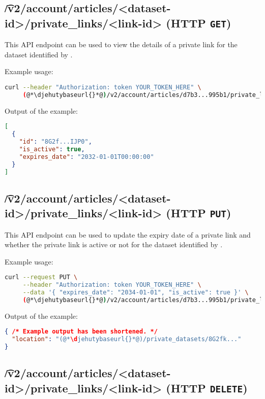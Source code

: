 \subsection{\t{/v2/account/articles/<dataset-id>/private\_links/<link-id>} (HTTP \texttt{GET})}

  This API endpoint can be used to view the details of a private link for
  the dataset identified by .

  Example usage:
\begin{lstlisting}[language=bash]
curl --header "Authorization: token YOUR_TOKEN_HERE" \
     (@*\djehutybaseurl{}*@)/v2/account/articles/d7b3...995b1/private_links/8G2fk... | jq
\end{lstlisting}

  Output of the example:
\begin{lstlisting}[language=JSON]
[
  {
    "id": "8G2f...IJP0",
    "is_active": true,
    "expires_date": "2032-01-01T00:00:00"
  }
]
\end{lstlisting}

\subsection{\t{/v2/account/articles/<dataset-id>/private\_links/<link-id>} (HTTP \texttt{PUT})}

  This API endpoint can be used to update the expiry date of a private link
  and whether the private link is active or not for the dataset identified
  by \code{dataset-id}.

  Example usage:
\begin{lstlisting}[language=bash]
curl --request PUT \
     --header "Authorization: token YOUR_TOKEN_HERE" \
     --data '{ "expires_date": "2034-01-01", "is_active": true }' \
     (@*\djehutybaseurl{}*@)/v2/account/articles/d7b3...995b1/private_links/8G2fk... | jq
\end{lstlisting}

  Output of the example:
\begin{lstlisting}[language=JSON]
{ /* Example output has been shortened. */
  "location": "(@*\djehutybaseurl{}*@)/private_datasets/8G2fk..."
}
\end{lstlisting}

\subsection{\t{/v2/account/articles/<dataset-id>/private\_links/<link-id>} (HTTP \texttt{DELETE})}

